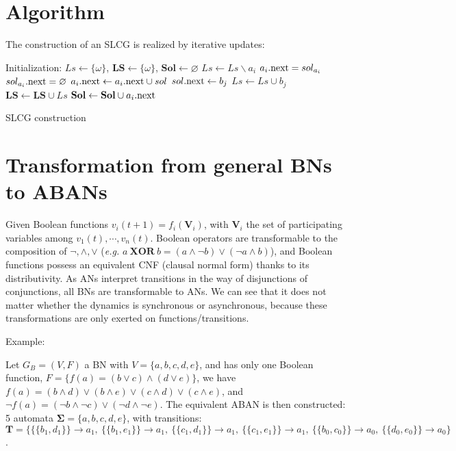 \documentclass[runningheads]{llncs}
\newcommand{\acm}[3]{\{#1\}\rightarrow#3}
\begin{document}
\section{Algorithm}\label{appendix:B}
The construction of an SLCG is realized by iterative updates:
\begin{algorithm}[ht]
\begin{algorithmic}
\State Initialization: 
$Ls\gets \{\omega\}$, $\mathbf{LS}\gets\{\omega\}$, $\mathbf{Sol}\gets \varnothing$
		\State $Ls\gets Ls\backslash a_i$
			\State $a_i{\rm .next}=sol_{a_i}$
            \State $sol_{a_i}{\rm .next}=\varnothing$
    	\Else
    		\For{$sol=\acm{A}{a_{\lnot i}}{a_i}\in \mathbf{T}$}
    			\State $a_i{\rm .next}\gets a_i{\rm .next}\cup sol$
    				\State $sol{\rm .next}\gets b_j$
    			\EndFor
    			\State $Ls\gets Ls\cup b_j$
                \State $\mathbf{LS}\gets \mathbf{LS}\cup Ls$
    		\EndFor
    		\State$\mathbf{Sol}\gets \mathbf{Sol}\cup a_i{\rm .next}$           
    	\EndIf
	\EndFor
\EndWhile
\State{}
\end{algorithmic}
\caption{SLCG construction}
\label{algorithm:2}
\end{algorithm}
\section{Transformation from general BNs to ABANs}\label{appendix:C}

Given Boolean functions $v_i (t+1)=f_i (\mathbf{V}_i)$, with $\mathbf{V}_i$ the set of participating variables among $v_1 (t),\cdots,v_n (t)$.
Boolean operators are transformable to the composition of $\lnot,\land,\lor$ (\textit{e.g.} $a\ \mathbf{XOR} \ b = (a\land \lnot b)\lor (\lnot a\land b)$), and Boolean functions possess an equivalent CNF (clausal normal form) thanks to its distributivity.
As ANs interpret transitions in the way of disjunctions of conjunctions, all BNs are transformable to ANs. 
We can see that it does not matter whether the dynamics is synchronous or asynchronous, because these transformations are only exerted on functions/transitions.

Example: 

Let $G_B=(V,F)$ a BN with $V=\{a,b,c,d,e\}$, and has only one Boolean function, $F=\{f (a)= (b\lor c)\land (d\lor e)\}$, we have 
$f (a)= (b\land d)\lor (b\land e)\lor (c\land d)\lor (c\land e)$, and $\lnot f (a)= (\lnot b\land \lnot c)\lor (\lnot d\land \lnot e)$. 
The equivalent ABAN is then constructed: 5 automata $\mathbf{\Sigma}=\{a,b,c,d,e\}$, with transitions: $\mathbf{T}=\{\acm{\{b_1,d_1\}}{a_0}{a_1},\ \acm{\{b_1,e_1\}}{a_0}{a_1},\ \acm{\{c_1,d_1\}}{a_0}{a_1},\ \acm{\{c_1,e_1\}}{a_0}{a_1},\ \acm{\{b_0,c_0\}}{a_1}{a_0},\ \acm{\{d_0,e_0\}}{a_1}{a_0}\}$.


\end{document}
